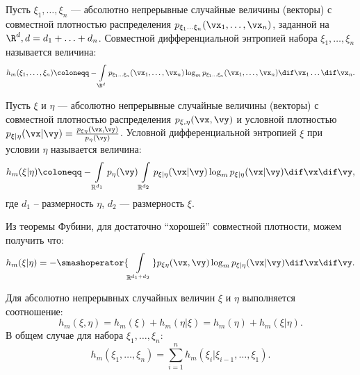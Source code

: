\begin{definition}
	Пусть $\xi_1, \ldots, \xi_n$ --- абсолютно непрерывные случайные величины (векторы) с совместной плотностью распределения $p_{\xi_1\ldots\xi_n}(\vx_1,\ldots,\vx_n)$, заданной на $\R^{d}, d = d_1 + \ldots + d_n$. Совместной дифференциальной энтропией набора $\xi_1, \ldots, \xi_n$ называется величина:
	\[
		h_m(\xi_1, \ldots, \xi_n) \coloneqq -\int\limits_{\R^{d}} p_{\xi_1\ldots\xi_n}(\vx_1,\ldots,\vx_n) \log_m p_{\xi_1\ldots\xi_n}(\vx_1,\ldots,\vx_n) \dif\vx_1\ldots\dif\vx_n.
	\]
\end{definition}

\begin{definition}
	Пусть $\xi$ и $\eta$ --- абсолютно непрерывные случайные величины (векторы) с совместной плотностью распределения $p_{\xi, \eta}(\vx,\vy)$ и условной плотностью $p_{\xi|\eta}(\vx|\vy) = \frac{p_{\xi\eta}(\vx,\vy)}{p_\eta(\vy)}$. Условной дифференциальной энтропией $\xi$ при условии $\eta$ называется величина:
	\[
		h_m(\xi | \eta) \coloneqq -\int\limits_{\mathbb{R}^{d_1}} p_\eta(\vy) \int\limits_{\mathbb{R}^{d_2}} p_{\xi|\eta}(\vx|\vy) \log_m p_{\xi|\eta}(\vx|\vy) \dif\vx \dif\vy,
	\]
	где $d_1$ -- размерность $\eta$, $d_2$ --- размерность $\xi$.
\end{definition}
\begin{remark}
	Из теоремы Фубини, для достаточно \enquote{хорошей} совместной плотности, можем получить что: 
	\[
		h_m(\xi | \eta) = -\smashoperator{\int\limits_{\mathbb{R}^{d_1 + d_2}}} p_{\xi\eta}(\vx,\vy) \log_m p_{\xi|\eta}(\vx|\vy) \dif\vx \dif\vy.
	\]
\end{remark}
\begin{proposition}
	\label{prop:chain-rule-diff}
	Для абсолютно непрерывных случайных величин $\xi$ и $\eta$ выполняется соотношение:
	\[
		h_m(\xi,\eta) = h_m(\xi) + h_m(\eta | \xi) = h_m(\eta) + h_m(\xi | \eta).
	\]
	В общем случае для набора $\xi_1, \ldots, \xi_n$:
	\[
		h_m(\xi_1, \ldots, \xi_n) = \sum_{i=1}^n h_m(\xi_i | \xi_{i-1}, \ldots, \xi_1).
	\]
	\end{proposition}

